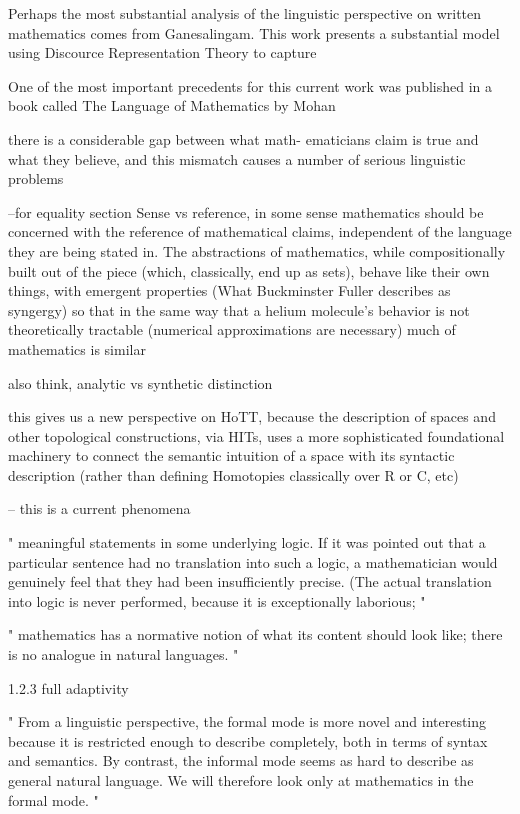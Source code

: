 Perhaps the most substantial analysis of the linguistic perspective on
written mathematics comes from Ganesalingam. This work presents a substantial
model using Discource Representation Theory to capture 

One of the most important precedents for this current work was published in a
book called The Language of Mathematics by Mohan

there is a considerable gap between what math-
ematicians claim is true and what they believe, and this mismatch causes a
number of serious linguistic problems
\cite{ganesalingam2013language}

--for equality section
Sense vs reference, in some sense mathematics should be concerned with the
reference of mathematical claims, independent of the language they are being
stated in.  The abstractions of mathematics, while compositionally built out of
the piece (which, classically, end up as sets), behave like their own things,
with emergent properties (What Buckminster Fuller describes as syngergy)
so that in the same way that a helium molecule's behavior is not theoretically
tractable (numerical approximations are necessary) much of mathematics is similar

also think, analytic vs synthetic distinction

this gives us a new perspective on HoTT, because the description of spaces and
other topological constructions, via HITs, uses a more sophisticated
foundational machinery to connect the semantic intuition of a space with its
syntactic description (rather than defining Homotopies classically over R or C, etc)


-- this is a current phenomena

"
meaningful statements in some underlying logic. If it was pointed out that
a particular sentence had no translation into such a logic, a mathematician
would genuinely feel that they had been insufficiently precise. (The actual
translation into logic is never performed, because it is exceptionally laborious;
"


"
mathematics has a normative notion of what its content should look like; there is no
analogue in natural languages.
"

1.2.3 full adaptivity


"
From a linguistic perspective, the formal mode is more novel and interesting
because it is restricted enough to describe completely, both in terms of syntax
and semantics. By contrast, the informal mode seems as hard to describe as
general natural language. We will therefore look only at mathematics in the
formal mode.
"


